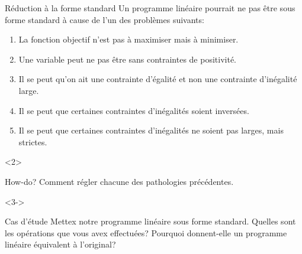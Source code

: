 \documentclass[aspectratio = 169]{beamer}
\begin{document}
\begin{frame}{R\'eduction \`a la forme standard}
  Un programme lin\'eaire pourrait ne pas \^etre sous forme standard
  \`a cause de l'un des probl\`emes suivants:
  \begin{enumerate}
  \item La fonction objectif n'est pas \`a maximiser mais \`a
    minimiser.
  \item Une variable peut ne pas \^etre sans contraintes de positivit\'e.
  \item Il se peut qu'on ait une contrainte d'\'egalit\'e et non une
    contrainte d'in\'egalit\'e large.
  \item Il se peut que certaines contraintes d'in\'egalit\'es soient invers\'ees.
  \item Il se peut que certaines contraintes d'in\'egalit\'es ne
    soient pas larges, mais strictes.
  \end{enumerate}
  \vspace{1em}
  \begin{overlayarea}{\textwidth}{.3\textheight}
    \begin{onlyenv}<2>
      \begin{halfshyblock}{How-do?}
        Comment r\'egler chacune des pathologies pr\'ec\'edentes.
      \end{halfshyblock}
    \end{onlyenv}
    \begin{onlyenv}<3->
      \begin{halfshyblock}{Cas d'\'etude}
        Mettex notre programme lin\'eaire sous forme standard. Quelles
        sont les op\'erations que vous avex effectu\'ees? Pourquoi
        donnent-elle un programme lin\'eaire \'equivalent \`a
        l'original?
      \end{halfshyblock}
    \end{onlyenv}
  \end{overlayarea}
\end{frame}
\end{document}
